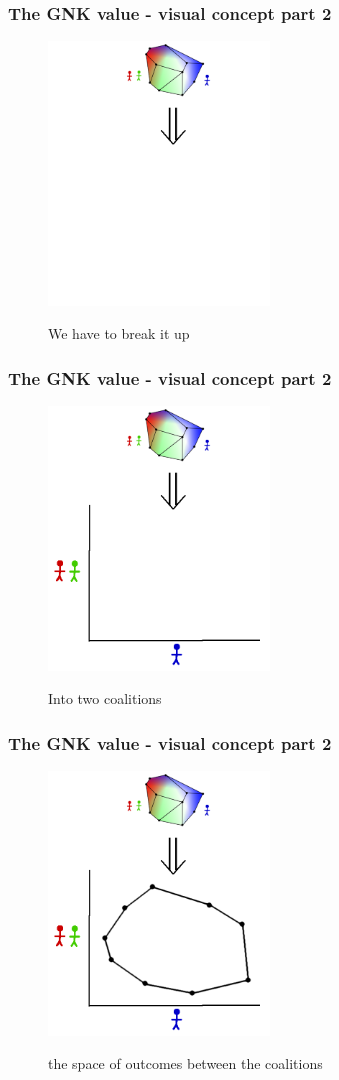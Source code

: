 \begin{frame} \frametitle{The GNK value - visual concept part 2} \begin{figure} \begin{center} \includegraphics[height=7cm]{figs/pa1} \end{center} We have to break it up \end{figure} \end{frame}
\begin{frame} \frametitle{The GNK value - visual concept part 2} \begin{figure} \begin{center} \includegraphics[height=7cm]{figs/pa2} \end{center} Into two coalitions \end{figure} \end{frame}
\begin{frame} \frametitle{The GNK value - visual concept part 2} \begin{figure} \begin{center} \includegraphics[height=7cm]{figs/pa3} \end{center} the space of outcomes between the coalitions \end{figure} \end{frame}
